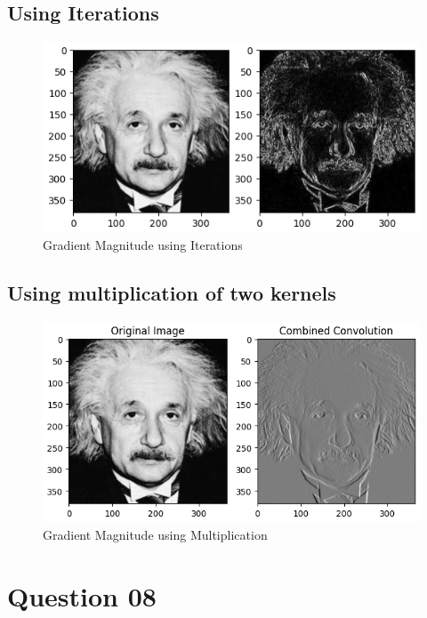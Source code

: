 \documentclass[11pt,a4paper]{article}
\begin{document}
\subsection{Using Iterations}

\lstset{style=mystyle}


{\begin{figure}[h]
    \centering
    \includegraphics[width=1\linewidth]{images/7-2.png}
    \caption{Gradient Magnitude using Iterations}
\end{figure}}


\subsection{Using multiplication of two kernels}
\lstset{style=mystyle}


{\begin{figure}[h]
    \centering
    \includegraphics[width=1\linewidth]{images/7-3.png}
    \caption{Gradient Magnitude using Multiplication}
\end{figure}}

\newpage

\section{Question 08}
\end{document}
